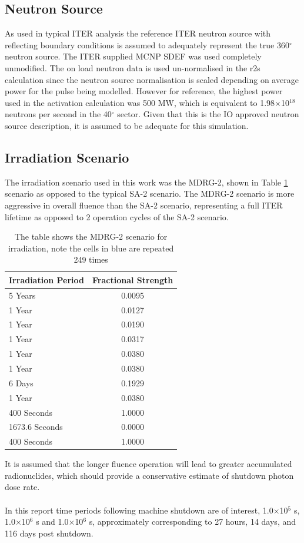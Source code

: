\documentclass[12pt]{article}
\begin{document}
\subsection{Neutron Source}
As used in typical ITER analysis the reference ITER neutron source with
reflecting boundary conditions is assumed to adequately represent the
true 360$^{\circ}$ neutron source. The ITER supplied MCNP SDEF was used
completely unmodified. The on load neutron data is used un-normalised
in the \gls{r2s} calculation since the neutron source normalisation is scaled
depending on average power for the pulse being modelled. However for reference,
the highest power used in the activation calculation was 500 MW, which is
equivalent to 1.98$\times$10$^{18}$ neutrons per second in the 40$^{\circ}$
sector. Given that this is the IO approved neutron source description, it is
assumed to be adequate for this simulation.
\subsection{Irradiation Scenario}
The irradiation scenario used in this work was the MDRG-2, shown in Table
\ref{tab:irrad_scenario} scenario as opposed to the typical SA-2 scenario.
The MDRG-2 scenario is more aggressive in overall fluence than the SA-2
scenario, representing a full ITER lifetime as opposed to 2 operation
cycles of the SA-2 scenario.
\begin{table}[ht!]
   \begin{tabular}{| l | c |}
      \hline 
      Irradiation Period & Fractional Strength \\
      \hline
      5 Years & 0.0095 \\
      1 Year  & 0.0127 \\
      1 Year  & 0.0190 \\
      1 Year  & 0.0317 \\
      1 Year  & 0.0380 \\
      1 Year  & 0.0380 \\
      6 Days  & 0.1929 \\
      1 Year  & 0.0380 \\
      \cellcolor{blue!25} 400 Seconds & 1.0000 \\
      \cellcolor{blue!25}1673.6 Seconds & 0.0000 \\
      400 Seconds & 1.0000 \\
      \hline
\end{tabular}
\caption{The table shows the MDRG-2 scenario for irradiation, note the
         cells in \textcolor{blue!25}{blue} are repeated 249 times}
\label{tab:irrad_scenario}
\end{table}
It is assumed that the longer fluence operation will lead to greater accumulated
radionuclides, which should provide a conservative estimate of shutdown photon
dose rate.
\\
\\
In this report time periods following machine shutdown are of interest,
1.0$\times$10$^5$ s, 1.0$\times$10$^6$ s and 1.0$\times$10$^6$ s, approximately
corresponding to 27 hours, 14 days, and 116 days post shutdown.
\end{document}
